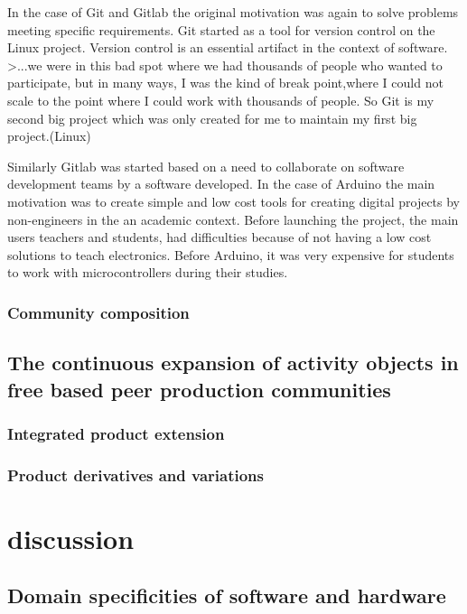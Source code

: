 \documentclass{ICED-Paper}%
\begin{document}
In the case of Git and Gitlab the original motivation was again to solve problems meeting specific requirements. Git started as a tool for version control on the Linux project. Version control is an essential artifact in the context of software.
>...we were in this bad spot where we had thousands of people
who wanted to participate, but in many ways, I was the kind of break point,where I could not scale to the point where I could work
with thousands of people. So Git is my second big project which was only created for me to maintain my first big project.(Linux)

Similarly Gitlab was started based on a need to collaborate on software development teams by a software developed. In the case of Arduino the main motivation was to create simple and low cost tools for creating digital projects by non-engineers in the an academic context. Before launching the project, the main users teachers and students, had difficulties because of not having a low cost solutions to teach electronics. Before Arduino, it was very expensive for students to work with microcontrollers during their studies.


\subsubsection{Community composition}

\subsection{The continuous expansion of activity objects in free based peer production communities}

\subsubsection{Integrated product extension}

\subsubsection{Product derivatives and variations}

\section{discussion}
\subsection{Domain specificities of software and hardware}
\end{document}
